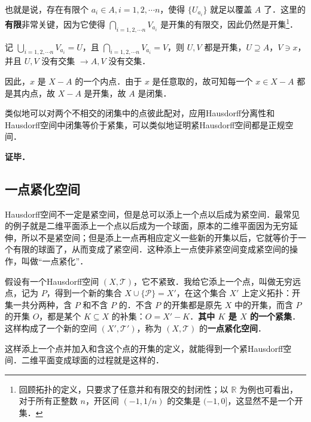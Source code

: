 也就是说，存在有限个 $a_i\in A, i=1, 2, \cdots n$，使得 $\{U_{a_i}\}$ 就足以覆盖 $A$ 了．这里的\textbf{有限}非常关键，因为它使得 $\bigcap\limits_{i=1,2, \cdots n}V_{a_i}$ 是开集的有限交，因此仍然是开集\footnote{回顾拓扑的定义，只要求了任意并和有限交的封闭性；以 $\mathbb{R}$ 为例也可看出，对于所有正整数 $n$，开区间 $(-1,1/n)$ 的交集是 $(-1, 0]$，这显然不是一个开集．}．

记 $\bigcup\limits_{i=1,2, \cdots n}V_{a_i}=U$，且 $\bigcap\limits_{i=1,2, \cdots n}V_{a_i}=V$，则 $U, V$ 都是开集，$U\supseteq A$，$V\ni x$，并且 $U, V$ 没有交集 $\rightarrow A, V$ 没有交集．

因此，$x$ 是 $X-A$ 的一个内点．由于 $x$ 是任意取的，故可知每一个 $x\in X-A$ 都是其内点，故 $X-A$ 是开集，故 $A$ 是闭集．

类似地可以对两个不相交的闭集中的点彼此配对，应用Hausdorff分离性和Hausdorff空间中闭集等价于紧集，可以类似地证明紧Hausdorff空间都是正规空间．


\textbf{证毕．}

\subsection{一点紧化空间}

Hausdorff空间不一定是紧空间，但是总可以添上一个点以后成为紧空间．最常见的例子就是二维平面添上一个点以后成为一个球面，原本的二维平面因为无穷延伸，所以不是紧空间；但是添上一点再相应定义一些新的开集以后，它就等价于一个有限的球面了，从而变成了紧空间．这种添上一点使非紧空间变成紧空间的操作，叫做“一点紧化”．

假设有一个Hausdorff空间 $(X, \mathcal{T})$，它不紧致．我给它添上一个点，叫做无穷远点，记为 $P$，得到一个新的集合 $X\cup \{\mathcal{P}\}=X'$，在这个集合 $X'$ 上定义拓扑：开集一共分两种，含 $P$ 和不含 $P$ 的．不含 $P$ 的开集都是原先 $X$ 中的开集，而含 $P$ 的开集 $O$，都是某个 $K\subseteq X$ 的补集：$O=X'-K$．\textbf{其中 $K$ 是 $X$ 的一个紧集}．这样构成了一个新的空间 $(X', \mathcal{T}')$，称为 $(X, \mathcal{T})$ 的\textbf{一点紧化空间}．

这样添上一个点并加入和含这个点的开集的定义，就能得到一个紧Hausdorff空间．二维平面变成球面的过程就是这样的．

